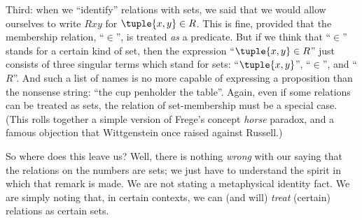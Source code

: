 \documentclass[../../../include/open-logic-section]{subfiles}
\begin{document}
Third: when we ``identify'' relations with sets, we said that we would allow ourselves to write $Rxy$ for $\tuple{x,y } \in R$. This is fine, provided that the membership relation, ``$\in$'', is treated \emph{as} a predicate. But if we think that ``$\in$'' stands for a certain kind of set, then the expression ``$\tuple{x,y} \in R$'' just consists of three singular terms which stand for sets: ``$\tuple{x,y}$'', ``$\in$'', and ``$R$''. And such a list of names is no more capable of expressing a proposition than the nonsense string: ``the cup penholder the table''. Again, even if some relations can be treated as sets, the relation of set-membership must be a special case. (This rolls together a simple version of Frege's concept \emph{horse} paradox, and a famous objection that Wittgenstein once raised against Russell.)

So where does this leave us? Well, there is nothing \emph{wrong} with our saying that the relations on the numbers are sets; we just have to understand the spirit in which that remark is made. We are not stating a metaphysical identity fact. We are simply noting that, in certain contexts, we can (and will) \emph{treat} (certain) relations as certain sets.
\end{document}
